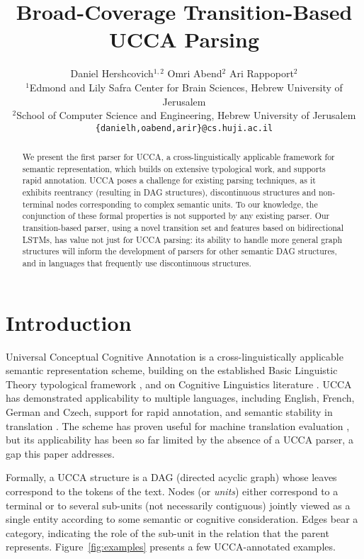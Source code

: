 \documentclass[11pt,a4paper]{article}
\title{Broad-Coverage Transition-Based UCCA Parsing}
\author{Daniel Hershcovich$^{1,2}$ \And Omri Abend$^2$ \And Ari Rappoport$^2$ \\
  $^1$Edmond and Lily Safra Center for Brain Sciences, Hebrew University of Jerusalem \\
  $^2$School of Computer Science and Engineering, Hebrew University of Jerusalem \\
  \texttt{\{danielh,oabend,arir\}@cs.huji.ac.il}
}
\date{}
\newcommand{\figref}[1]{Figure~\ref{#1}}
\begin{document}
\maketitle

\begin{abstract}
  We present the first parser for UCCA, a
  cross-linguistically applicable framework for semantic
  representation, which builds on extensive
  typological work, and supports rapid annotation.
  UCCA poses a challenge for existing parsing techniques,
  as it exhibits reentrancy (resulting in DAG structures),
  discontinuous structures and non-terminal nodes corresponding
  to complex semantic units. To our knowledge, the conjunction
  of these formal properties is not supported by any existing parser.
  Our transition-based parser, using a novel transition set
  and features based on bidirectional LSTMs,
  has value not just for UCCA parsing:
  its ability to handle more general graph structures will inform
  the development of parsers for other semantic DAG structures, 
  and in languages that frequently use discontinuous structures.
\end{abstract}


\section{Introduction}\label{sec:introduction}

Universal Conceptual Cognitive Annotation \cite[UCCA,][]{abend2013universal}
is a cross-linguistically applicable semantic representation scheme,
building on the established Basic Linguistic Theory typological framework
\cite{Dixon:10b,Dixon:10a,Dixon:12}, and on Cognitive
Linguistics literature \cite{croft2004cognitive}.
UCCA has demonstrated applicability to multiple languages, including
English, French, German and Czech, support for rapid annotation,
and semantic stability in translation \cite{sulem2015conceptual}.
The scheme has proven useful for machine translation evaluation \cite{birch2016hume},
but its applicability has been so far limited by the absence of a UCCA parser,
a gap this paper addresses.

Formally, a UCCA structure is a DAG (directed acyclic graph)
whose leaves correspond to the tokens of
the text. Nodes (or {\it units}) either correspond to a terminal or
to several sub-units (not necessarily contiguous) jointly viewed as a
single entity according to some semantic or cognitive consideration.
Edges bear a category, indicating the role of the sub-unit in the relation
that the parent represents. \figref{fig:examples} presents a few UCCA-annotated examples.
\end{document}
